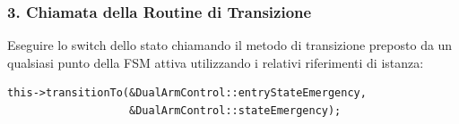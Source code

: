 \documentclass[11pt,a4paper]{article}
\begin{document}
\subsubsection*{3. Chiamata della Routine di Transizione}
Eseguire lo switch dello stato chiamando il metodo di transizione preposto da un qualsiasi punto della FSM attiva utilizzando i relativi riferimenti di istanza:
\begin{lstlisting}
this->transitionTo(&DualArmControl::entryStateEmergency, 
                   &DualArmControl::stateEmergency);
\end{lstlisting}
\end{document}
